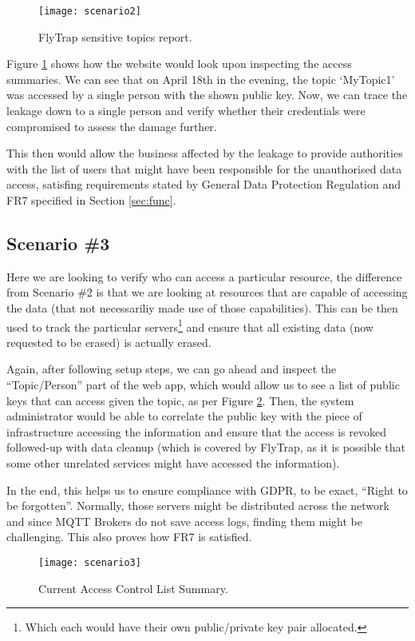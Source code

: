 \begin{figure}[h]
    \centering
    \texttt{[image: scenario2]}
    \caption{FlyTrap sensitive topics report.}
    \label{fig:scenario2}
\end{figure}

Figure \ref{fig:scenario2} shows how the website would look upon inspecting the access summaries. We can see that on April 18th in the evening, the topic `MyTopic1' was accessed by a single person with the shown public key. Now, we can trace the leakage down to a single person and verify whether their credentials were compromised to assess the damage further.

This then would allow the business affected by the leakage to provide authorities with the list of users that might have been responsible for the unauthorised data access, satisfing requirements stated by General Data Protection Regulation and FR7 specified in Section \ref{sec:func}.

\subsection{Scenario \#3}
Here we are looking to verify who can access a particular resource, the difference from Scenario \#2 is that we are looking at resources that are capable of accessing the data (that not necessariliy made use of those capabilities). This can be then used to track the particular servers\footnote{Which each would have their own public/private key pair allocated.} and ensure that all existing data (now requested to be erased) is actually erased.

Again, after following setup steps, we can go ahead and inspect the ``Topic/Person'' part of the web app, which would allow us to see a list of public keys that can access given the topic, as per Figure \ref{fig:scenario3}. Then, the system administrator would be able to correlate the public key with the piece of infrastructure accessing the information and ensure that the access is revoked followed-up with data cleanup (which is covered by FlyTrap, as it is possible that some other unrelated services might have accessed the information).

In the end, this helps us to ensure compliance with GDPR, to be exact, ``Right to be forgotten''. Normally, those servers might be distributed across the network and since MQTT Brokers do not save access logs, finding them might be challenging. This also proves how FR7 is satisfied.
\begin{figure}[h]
    \centering
    \texttt{[image: scenario3]}
    \caption{Current Access Control List Summary.}
    \label{fig:scenario3}
\end{figure}
